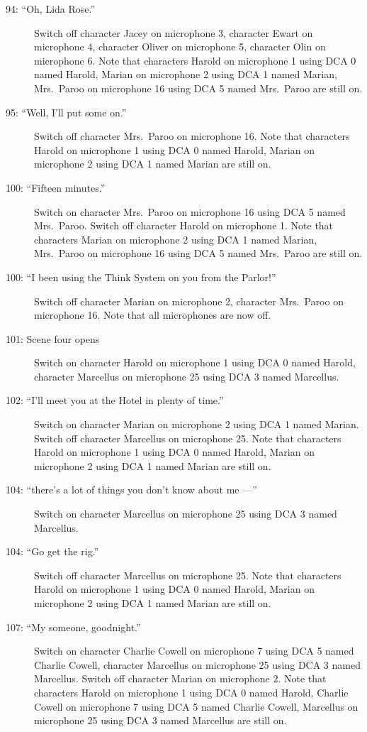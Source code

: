 \begin{description}
\item[94: ``Oh, Lida Rose.'']
Switch off character Jacey on microphone 3, character Ewart on microphone 4, character Oliver on microphone 5, character Olin on microphone 6. Note that characters Harold on microphone 1 using DCA 0 named Harold, Marian on microphone 2 using DCA 1 named Marian, Mrs.~Paroo on microphone 16 using DCA 5 named Mrs.~Paroo are still on.  

\item[95: ``Well, I'll put some on.'']
Switch off character Mrs.~Paroo on microphone 16. Note that characters Harold on microphone 1 using DCA 0 named Harold, Marian on microphone 2 using DCA 1 named Marian are still on.  

\item[100: ``Fifteen minutes.'']
Switch on character Mrs.~Paroo on microphone 16 using DCA 5 named Mrs.~Paroo. Switch off character Harold on microphone 1. Note that characters Marian on microphone 2 using DCA 1 named Marian, Mrs.~Paroo on microphone 16 using DCA 5 named Mrs.~Paroo are still on.  

\item[100: ``I been using the Think System on you from the Parlor!'']
Switch off character Marian on microphone 2, character Mrs.~Paroo on microphone 16. Note that all microphones are now off.

\item[101: Scene four opens]
Switch on character Harold on microphone 1 using DCA 0 named Harold, character Marcellus on microphone 25 using DCA 3 named Marcellus. 

\item[102: ``I'll meet you at the Hotel in plenty of time.'']
Switch on character Marian on microphone 2 using DCA 1 named Marian. Switch off character Marcellus on microphone 25. Note that characters Harold on microphone 1 using DCA 0 named Harold, Marian on microphone 2 using DCA 1 named Marian are still on.  

\item[104: ``there's a lot of things you don't know about me ---'']
Switch on character Marcellus on microphone 25 using DCA 3 named Marcellus. 

\item[104: ``Go get the rig.'']
Switch off character Marcellus on microphone 25. Note that characters Harold on microphone 1 using DCA 0 named Harold, Marian on microphone 2 using DCA 1 named Marian are still on.  

\item[107: ``My someone, goodnight.'']
Switch on character Charlie Cowell on microphone 7 using DCA 5 named Charlie Cowell, character Marcellus on microphone 25 using DCA 3 named Marcellus. Switch off character Marian on microphone 2. Note that characters Harold on microphone 1 using DCA 0 named Harold, Charlie Cowell on microphone 7 using DCA 5 named Charlie Cowell, Marcellus on microphone 25 using DCA 3 named Marcellus are still on.  


\end{description}
